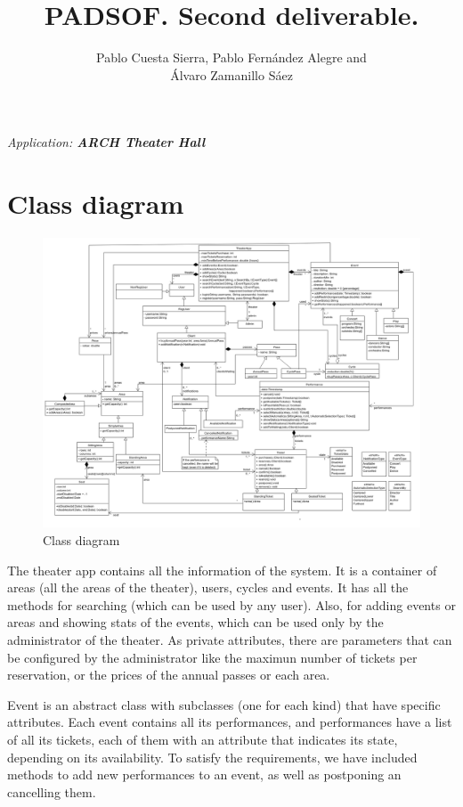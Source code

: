\documentclass{article}
\title{PADSOF. Second deliverable.}
\author{Pablo Cuesta Sierra, Pablo Fernández Alegre and\\Álvaro Zamanillo Sáez}
\date{}
\begin{document}
\maketitle

\begin{center}
    \textsl{Application: \textbf{ARCH Theater Hall}}
\end{center}

\tableofcontents

\newpage

\section{Class diagram}

\begin{figure}[h]
    \centering
    \includegraphics[scale=.2929306]{../class_diagram/ver2}
    \caption{Class diagram}
\end{figure}

The theater app contains all the information of the system. It is a container of areas (all the areas of the theater), users, cycles and events. 
It has all the methods for searching (which can be used by any user). 
Also, for adding events or areas and showing stats of the events, which can be used only by the administrator of the theater. 
As private attributes, there are parameters that can be configured by the administrator like the maximun number of tickets per reservation, or the prices of the annual passes or each area.

Event is an abstract class with subclasses (one for each kind) that have specific attributes. 
Each event contains all its performances, and performances have a list of all its tickets, each of them with an attribute that indicates its state, depending on its availability. 
To satisfy the requirements, we have included methods to add new performances to an event, as well as postponing an cancelling them.
\end{document}
